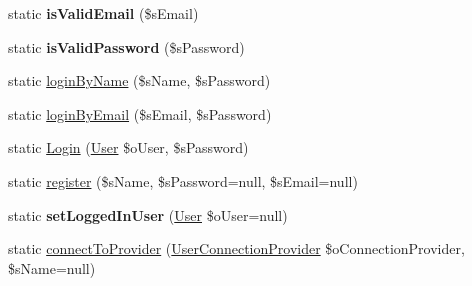 \begin{DoxyCompactItemize}
\item 
\hypertarget{class_user_manager_a520cfbed0ef55c581cc35af719291bff}{static {\bfseries is\-Valid\-Email} (\$s\-Email)}\label{class_user_manager_a520cfbed0ef55c581cc35af719291bff}

\item 
\hypertarget{class_user_manager_a5fbc12b8dab6681800bd3f32bd4a829a}{static {\bfseries is\-Valid\-Password} (\$s\-Password)}\label{class_user_manager_a5fbc12b8dab6681800bd3f32bd4a829a}

\item 
static \hyperlink{class_user_manager_a4e784f68f64490ff3b720d23f84c9779}{login\-By\-Name} (\$s\-Name, \$s\-Password)
\item 
static \hyperlink{class_user_manager_a8c1e6b4944da796eef0b2ec4bd439f99}{login\-By\-Email} (\$s\-Email, \$s\-Password)
\item 
static \hyperlink{class_user_manager_a94019f68548180dcc2eb48235c22cf97}{Login} (\hyperlink{class_user}{User} \$o\-User, \$s\-Password)
\item 
static \hyperlink{class_user_manager_afc1079269b9f03c106b32d34565b5044}{register} (\$s\-Name, \$s\-Password=null, \$s\-Email=null)
\item 
\hypertarget{class_user_manager_a80b5243445feff69fb5598f39e2a17f5}{static {\bfseries set\-Logged\-In\-User} (\hyperlink{class_user}{User} \$o\-User=null)}\label{class_user_manager_a80b5243445feff69fb5598f39e2a17f5}

\item 
static \hyperlink{class_user_manager_acddaa28b993a1363824f852fb5afa11a}{connect\-To\-Provider} (\hyperlink{class_user_connection_provider}{User\-Connection\-Provider} \$o\-Connection\-Provider, \$s\-Name=null)
\end{DoxyCompactItemize}


